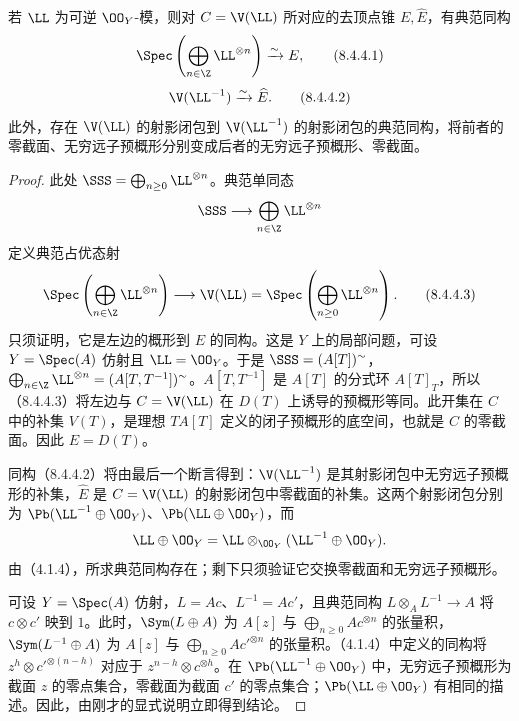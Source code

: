 若 $\LL$ 为可逆 $\OO_Y$-模，则对 $C=\V(\LL)$ 所对应的去顶点锥 $E,\widehat E$，有典范同构
\begin{equation}
\Spec\left(\bigoplus_{n\in\Z}\LL^{\otimes n}\right)\xrightarrow{\sim}E,
\tag{8.4.4.1}
\end{equation}
\begin{equation}
\V(\LL^{-1})\xrightarrow{\sim}\widehat E.
\tag{8.4.4.2}
\end{equation}
此外，存在 $\V(\LL)$ 的射影闭包到 $\V(\LL^{-1})$ 的射影闭包的典范同构，将前者的零截面、无穷远子预概形分别变成后者的无穷远子预概形、零截面。
\begin{proof}
此处 $\SSS=\bigoplus_{n\geq0}\LL^{\otimes n}$。典范单同态
\[
\SSS\longrightarrow\bigoplus_{n\in\Z}\LL^{\otimes n}
\]
定义典范占优态射
\begin{equation}
\Spec\left(\bigoplus_{n\in\Z}\LL^{\otimes n}\right)
\longrightarrow\V(\LL)=\Spec\left(\bigoplus_{n\geq0}\LL^{\otimes n}\right).
\tag{8.4.4.3}
\end{equation}
只须证明，它是左边的概形到 $E$ 的同构。这是 $Y$ 上的局部问题，可设 $Y=\Spec(A)$ 仿射且 $\LL=\OO_Y$。于是 $\SSS=(A[T])^{\sim}$，$\bigoplus_{n\in\Z}\LL^{\otimes n}=(A[T,T^{-1}])^{\sim}$。$A[T,T^{-1}]$ 是 $A[T]$ 的分式环 $A[T]_T$，所以（8.4.4.3）将左边与 $C=\V(\LL)$ 在 $D(T)$ 上诱导的预概形等同。此开集在 $C$ 中的补集 $V(T)$，是理想 $TA[T]$ 定义的闭子预概形的底空间，也就是 $C$ 的零截面。因此 $E=D(T)$。

同构（8.4.4.2）将由最后一个断言得到：$\V(\LL^{-1})$ 是其射影闭包中无穷远子预概形的补集，$\widehat E$ 是 $C=\V(\LL)$ 的射影闭包中零截面的补集。这两个射影闭包分别为 $\Pb(\LL^{-1}\oplus\OO_Y)$、$\Pb(\LL\oplus\OO_Y)$，而
\[
\LL\oplus\OO_Y=\LL\otimes_{\OO_Y}(\LL^{-1}\oplus\OO_Y).
\]
由（4.1.4），所求典范同构存在；剩下只须验证它交换零截面和无穷远子预概形。

可设 $Y=\Spec(A)$ 仿射，$L=Ac$、$L^{-1}=Ac'$，且典范同构 $L\otimes_A L^{-1}\to A$ 将 $c\otimes c'$ 映到 $1$。此时，$\Sym(L\oplus A)$ 为 $A[z]$ 与 $\bigoplus_{n\geq0}Ac^{\otimes n}$ 的张量积，$\Sym(L^{-1}\oplus A)$ 为 $A[z]$ 与 $\bigoplus_{n\geq0}Ac'^{\otimes n}$ 的张量积。（4.1.4）中定义的同构将 $z^h\otimes c'^{\otimes(n-h)}$ 对应于 $z^{n-h}\otimes c^{\otimes h}$。在 $\Pb(\LL^{-1}\oplus\OO_Y)$ 中，无穷远子预概形为截面 $z$ 的零点集合，零截面为截面 $c'$ 的零点集合；$\Pb(\LL\oplus\OO_Y)$ 有相同的描述。因此，由刚才的显式说明立即得到结论。
\end{proof}

